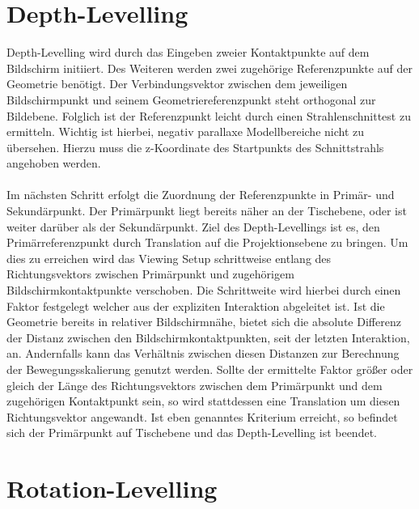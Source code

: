 \section{Depth-Levelling}
\label{sec:depth_levelling}

Depth-Levelling wird durch das Eingeben zweier Kontaktpunkte auf dem Bildschirm initiiert. Des Weiteren werden zwei zugehörige Referenzpunkte auf der Geometrie benötigt. Der Verbindungsvektor zwischen dem jeweiligen Bildschirmpunkt und seinem Geometriereferenzpunkt steht orthogonal zur Bildebene. Folglich ist der Referenzpunkt leicht durch einen Strahlenschnittest zu ermitteln. Wichtig ist hierbei, negativ parallaxe Modellbereiche nicht zu übersehen. Hierzu muss die z-Koordinate des Startpunkts des Schnittstrahls angehoben werden. 
\\\\
Im nächsten Schritt erfolgt die Zuordnung der Referenzpunkte in Primär- und Sekundärpunkt. Der Primärpunkt liegt bereits näher an der Tischebene, oder ist weiter darüber als der Sekundärpunkt. Ziel des Depth-Levellings ist es, den Primärreferenzpunkt durch Translation auf die Projektionsebene zu bringen. Um dies zu erreichen wird das Viewing Setup schrittweise entlang des Richtungsvektors zwischen Primärpunkt und zugehörigem Bildschirmkontaktpunkte verschoben. Die Schrittweite wird hierbei durch einen Faktor festgelegt welcher aus der expliziten Interaktion abgeleitet ist. Ist die Geometrie bereits in relativer Bildschirmnähe, bietet sich die absolute Differenz der Distanz zwischen den Bildschirmkontaktpunkten, seit der letzten Interaktion, an. Andernfalls kann das Verhältnis zwischen diesen Distanzen zur Berechnung der Bewegungsskalierung genutzt werden. Sollte der ermittelte Faktor größer oder gleich der Länge des Richtungsvektors zwischen dem Primärpunkt und dem zugehörigen Kontaktpunkt sein, so wird stattdessen eine Translation um diesen Richtungsvektor angewandt. Ist eben genanntes Kriterium erreicht, so befindet sich der Primärpunkt auf Tischebene und das Depth-Levelling ist beendet.


\section{Rotation-Levelling}
\label{sec:rotation_levelling}

